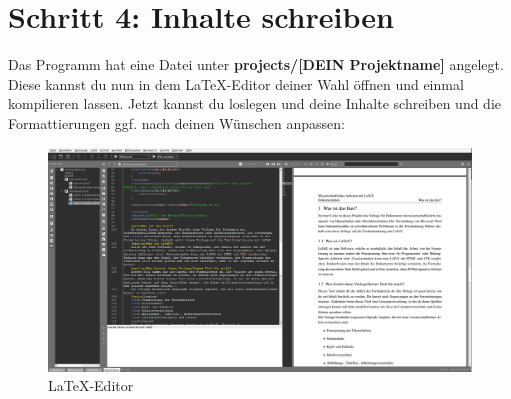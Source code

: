 \documentclass[12pt]{article}
\begin{document}
\section{Schritt 4: Inhalte schreiben}
Das Programm hat eine Datei unter \textbf{projects/[DEIN Projektname]} angelegt. Diese kannst du nun in dem LaTeX-Editor deiner Wahl öffnen und einmal kompilieren lassen. Jetzt kannst du loslegen und deine Inhalte schreiben und die Formattierungen ggf. nach deinen Wünschen anpassen:
\FloatBarrier
\begin{figure}[!ht]
\includegraphics[width=.9\textwidth]{images/screenshot_4.png}
\caption{LaTeX-Editor}
\end{figure}
\FloatBarrier
\end{document}
